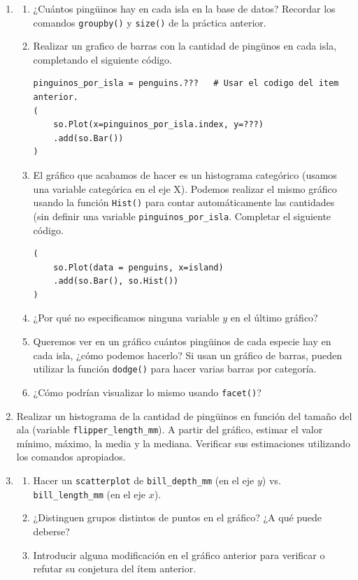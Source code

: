 \documentclass[a4paper,11pt]{article}
\theoremstyle{definition}
\begin{document}
\begin{enumerate}[resume]
\item 
\begin{enumerate}
\item ¿Cuántos pingüinos hay en cada isla en la base de datos? Recordar los comandos \lstinline{groupby()} y \lstinline{size()} de la práctica anterior.
\item Realizar un grafico de barras con la cantidad de pingünos en cada isla, completando el siguiente código.
\begin{lstlisting}
pinguinos_por_isla = penguins.???   # Usar el codigo del item anterior.
(
    so.Plot(x=pinguinos_por_isla.index, y=???)
    .add(so.Bar())
)
\end{lstlisting}
\item El gráfico que acabamos de hacer es un histograma categórico (usamos una variable categórica en el eje X). Podemos realizar el mismo gráfico usando la función \lstinline{Hist()} para contar automáticamente las cantidades (sin definir una variable \lstinline{pinguinos_por_isla}. Completar el siguiente código.
\begin{lstlisting}
(
    so.Plot(data = penguins, x=island)
    .add(so.Bar(), so.Hist())
)
\end{lstlisting}
\item ¿Por qué no especificamos ninguna variable $y$ en el último gráfico?
\item Queremos ver en un gráfico cuántos pingüinos de cada especie hay en cada isla, ¿cómo podemos hacerlo? Si usan un gráfico de barras, pueden utilizar la función \lstinline{dodge()} para hacer varias barras por categoría.
\item ¿Cómo podrían visualizar lo mismo usando \lstinline{facet()}?
\end{enumerate}

\item Realizar un histograma de la cantidad de pingüinos en función del tamaño del ala (variable \lstinline{flipper_length_mm}). A partir del gráfico, estimar el valor mínimo, máximo, la media y la mediana. Verificar sus estimaciones utilizando los comandos apropiados.

\item \label{depthvslength}
\begin{enumerate}
\item Hacer un \lstinline{scatterplot} de \lstinline{bill_depth_mm} (en el eje $y$) vs. \lstinline{bill_length_mm} (en el eje $x$).
\item ¿Distinguen grupos distintos de puntos en el gráfico? ¿A qué puede deberse?
\item Introducir alguna modificación en el gráfico anterior para verificar o refutar su conjetura del ítem anterior.
\end{enumerate}


\end{enumerate}
\end{document}
